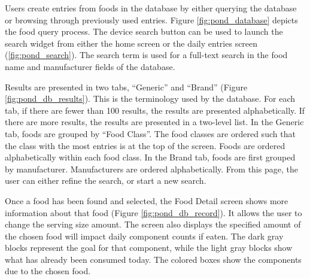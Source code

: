 Users create entries from foods in the database by either querying the database or browsing through previously used entries. Figure \ref{fig:pond_database} depicts the food query process. The device search button can be used to launch the search widget from either the home screen or the daily entries screen (\ref{fig:pond_search}). The search term is used for a full-text search in the food name and manufacturer fields of the database. 

Results are presented in two tabs, ``Generic'' and ``Brand'' (Figure \ref{fig:pond_db_results}). This is the terminology used by the database.  For each tab, if there are fewer than 100 results, the results are presented alphabetically. If there are more results, the results are presented in a two-level list. In the Generic tab, foods are grouped by ``Food Class''. The food classes are ordered such that the class with the most entries is at the top of the screen. Foods are ordered alphabetically within each food class. In the Brand tab, foods are first grouped by manufacturer. Manufacturers are ordered alphabetically. From this page, the user can either refine the search, or start a new search. 

Once a food has been found and selected, the Food Detail screen shows more information about that food (Figure \ref{fig:pond_db_record}). It allows the user to change the serving size amount. The screen also displays the specified amount of the chosen food will impact daily component counts if eaten. The dark gray blocks represent the goal for that component, while the light gray blocks show what has already been consumed today. The colored boxes show the components due to the chosen food.

